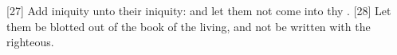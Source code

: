 [27] \textcolor[cmyk]{0.99998,1,0,0}{Add iniquity unto their iniquity: and let them not come into thy .} %
[28] \textcolor[cmyk]{0.99998,1,0,0}{Let them be blotted out of the book of the living, and not be written with the righteous.} %
